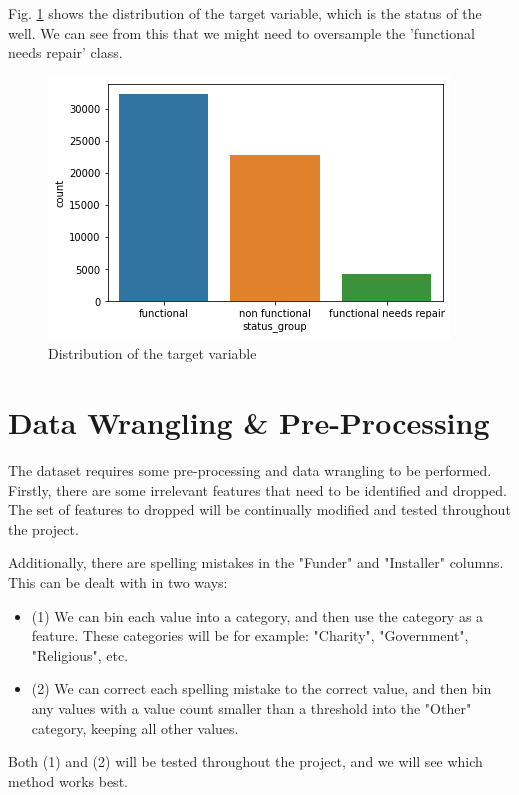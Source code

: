 \documentclass[twocolumn]{article}
\begin{document}
Fig. \ref{fig:status_groups} shows the distribution of the target variable, which is the status of the well. We can see from this that we might need to oversample the 'functional needs repair' class.

\begin{figure}[h]
    \centering
    \includegraphics[scale=0.5]{figures/status_groups.png}
    \caption{Distribution of the target variable}
    \label{fig:status_groups}
\end{figure}

\section{Data Wrangling \& Pre-Processing}

The dataset requires some pre-processing and data wrangling to be performed. Firstly, there are some irrelevant features that need to be identified and dropped. The set of features to dropped will be continually modified and tested throughout the project.

Additionally, there are spelling mistakes in the "Funder" and "Installer" columns. This can be dealt with in two ways:
    \begin{itemize}
        \item (1) We can bin each value into a category, and then use the category as a feature. These categories will be for example: "Charity", "Government", "Religious", etc.
        \item (2) We can correct each spelling mistake to the correct value, and then bin any values with a value count smaller than a threshold into the "Other" category, keeping all other values.
    \end{itemize}

Both (1) and (2) will be tested throughout the project, and we will see which method works best. 
\end{document}
